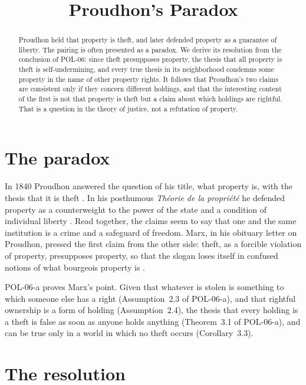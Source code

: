 \documentclass{situationist-preprint}
\title{Proudhon's Paradox}
\begin{document}
\maketitle

\begin{abstract}
Proudhon held that property is theft, and later defended property as a guarantee of liberty. The pairing is often presented as a paradox. We derive its resolution from the conclusion of POL-06: since theft presupposes property, the thesis that all property is theft is self-undermining, and every true thesis in its neighborhood condemns some property in the name of other property rights. It follows that Proudhon's two claims are consistent only if they concern different holdings, and that the interesting content of the first is not that property is theft but a claim about which holdings are rightful. That is a question in the theory of justice, not a refutation of property.
\end{abstract}

\section{The paradox}

In 1840 Proudhon answered the question of his title, what property is, with the thesis that it is theft \citep{Proudhon1840}. In his posthumous \emph{Th\'eorie de la propri\'et\'e} he defended property as a counterweight to the power of the state and a condition of individual liberty \citep{Proudhon1866}. Read together, the claims seem to say that one and the same institution is a crime and a safeguard of freedom. Marx, in his obituary letter on Proudhon, pressed the first claim from the other side: theft, as a forcible violation of property, presupposes property, so that the slogan loses itself in confused notions of what bourgeois property is \citep{Marx1865}.

POL-06-a proves Marx's point. Given that whatever is stolen is something to which someone else has a right (Assumption~2.3 of POL-06-a), and that rightful ownership is a form of holding (Assumption~2.4), the thesis that every holding is a theft is false as soon as anyone holds anything (Theorem~3.1 of POL-06-a), and can be true only in a world in which no theft occurs (Corollary~3.3).

\section{The resolution}
\end{document}
